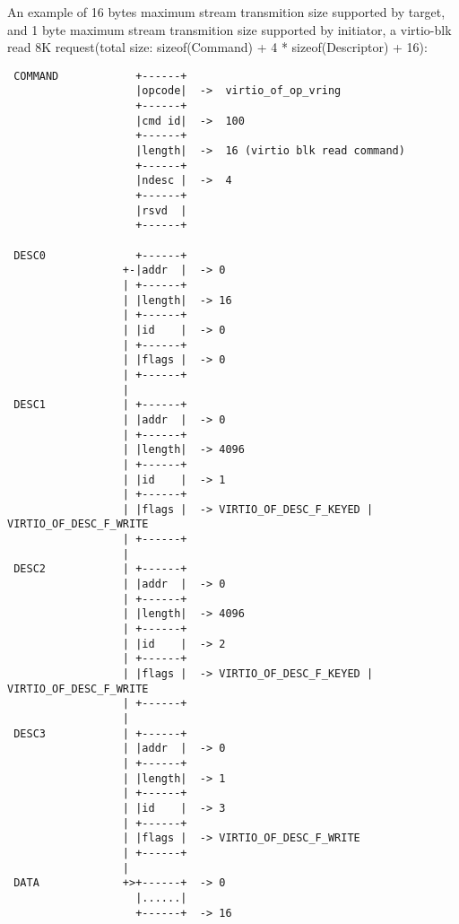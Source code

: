 An example of 16 bytes maximum stream transmition size supported by target, and 1 byte maximum stream transmition size supported by initiator, a virtio-blk read 8K request(total size: sizeof(Command) + 4 * sizeof(Descriptor) + 16):
\begin{lstlisting}
 COMMAND            +------+
                    |opcode|  ->  virtio_of_op_vring
                    +------+
                    |cmd id|  ->  100
                    +------+
                    |length|  ->  16 (virtio blk read command)
                    +------+
                    |ndesc |  ->  4
                    +------+
                    |rsvd  |
                    +------+

 DESC0              +------+
                  +-|addr  |  -> 0
                  | +------+
                  | |length|  -> 16
                  | +------+
                  | |id    |  -> 0
                  | +------+
                  | |flags |  -> 0
                  | +------+
                  |
 DESC1            | +------+
                  | |addr  |  -> 0
                  | +------+
                  | |length|  -> 4096
                  | +------+
                  | |id    |  -> 1
                  | +------+
                  | |flags |  -> VIRTIO_OF_DESC_F_KEYED | VIRTIO_OF_DESC_F_WRITE
                  | +------+
                  |
 DESC2            | +------+
                  | |addr  |  -> 0
                  | +------+
                  | |length|  -> 4096
                  | +------+
                  | |id    |  -> 2
                  | +------+
                  | |flags |  -> VIRTIO_OF_DESC_F_KEYED | VIRTIO_OF_DESC_F_WRITE
                  | +------+
                  |
 DESC3            | +------+
                  | |addr  |  -> 0
                  | +------+
                  | |length|  -> 1
                  | +------+
                  | |id    |  -> 3
                  | +------+
                  | |flags |  -> VIRTIO_OF_DESC_F_WRITE
                  | +------+
                  |
 DATA             +>+------+  -> 0
                    |......|
                    +------+  -> 16
\end{lstlisting}

